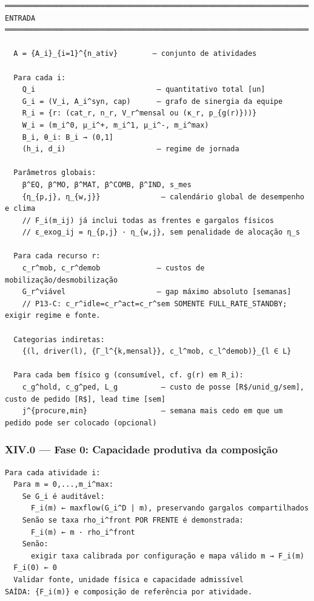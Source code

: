 \documentclass[
  10pt,
]{article}
\begin{document}
\begin{verbatim}
══════════════════════════════════════════════════════════════════════
ENTRADA
══════════════════════════════════════════════════════════════════════

  A = {A_i}_{i=1}^{n_ativ}        — conjunto de atividades

  Para cada i:
    Q_i                            — quantitativo total [un]
    G_i = (V_i, A_i^syn, cap)      — grafo de sinergia da equipe
    R_i = {r: (cat_r, n_r, V_r^mensal ou (κ_r, p_{g(r)}))}
    W_i = (m_i^0, μ_i^+, m_i^1, μ_i^-, m_i^max)
    B_i, θ_i: B_i → (0,1]
    (h_i, d_i)                     — regime de jornada

  Parâmetros globais:
    β^EQ, β^MO, β^MAT, β^COMB, β^IND, s_mes
    {η_{p,j}, η_{w,j}}              — calendário global de desempenho e clima
    // F_i(m_ij) já inclui todas as frentes e gargalos físicos
    // ε_exog_ij = η_{p,j} · η_{w,j}, sem penalidade de alocação η_s

  Para cada recurso r:
    c_r^mob, c_r^demob             — custos de mobilização/desmobilização
    G_r^viável                     — gap máximo absoluto [semanas]
    // P13-C: c_r^idle=c_r^act=c_r^sem SOMENTE FULL_RATE_STANDBY; exigir regime e fonte.

  Categorias indiretas:
    {(l, driver(l), {Γ_l^{k,mensal}}, c_l^mob, c_l^demob)}_{l ∈ L}

  Para cada bem físico g (consumível, cf. g(r) em R_i):
    c_g^hold, c_g^ped, L_g          — custo de posse [R$/unid_g/sem], custo de pedido [R$], lead time [sem]
    j^{procure,min}                 — semana mais cedo em que um pedido pode ser colocado (opcional)
\end{verbatim}

\hypertarget{xiv.0-fase-0-resoluuxe7uxe3o-de-produtividade}{%
\subsubsection{XIV.0 --- Fase 0: Capacidade produtiva da
composição}\label{xiv.0-fase-0-resoluuxe7uxe3o-de-produtividade}}

\begin{verbatim}
Para cada atividade i:
  Para m = 0,...,m_i^max:
    Se G_i é auditável:
      F_i(m) ← maxflow(G_i^D | m), preservando gargalos compartilhados
    Senão se taxa rho_i^front POR FRENTE é demonstrada:
      F_i(m) ← m · rho_i^front
    Senão:
      exigir taxa calibrada por configuração e mapa válido m → F_i(m)
  F_i(0) ← 0
  Validar fonte, unidade física e capacidade admissível
SAÍDA: {F_i(m)} e composição de referência por atividade.
\end{verbatim}
\end{document}
